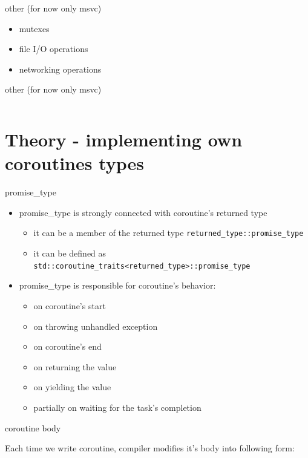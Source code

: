 \documentclass[10pt]{beamer}
\newcommand{\code}[1]{\texttt{#1}}
\begin{document}
\begin{frame}{other (for now only msvc)}
  \begin{itemize}
    \item mutexes
    \item file I/O operations
    \item networking operations
  \end{itemize}
\end{frame}

\begin{frame}{other (for now only msvc)}
  \inputminted[firstline=4]{c++}{code-examples/cppcoro/io.cpp}
\end{frame}

\section{Theory - implementing own coroutines types}

\begin{frame}{promise\_type}
  \begin{itemize}[<+- |alert@+>]
    \item promise\_type is strongly connected with coroutine's returned type
    \begin{itemize}[<+- |alert@+>]
      \item it can be a member of the returned type \code{returned\_type::promise\_type}
      \item it can be defined as \code{std::coroutine\_traits<returned\_type>::promise\_type}
    \end{itemize}
    \item promise\_type is responsible for coroutine's behavior:
    \begin{itemize}
      \item on coroutine's start
      \item on throwing unhandled exception
      \item on coroutine's end
      \item on returning the value
      \item on yielding the value
      \item partially on waiting for the task's completion
    \end{itemize}
  
  \end{itemize}
\end{frame}

\begin{frame}{coroutine body}
\centerline{Each time we write coroutine, compiler modifies it's body into following form:}
\inputminted[firstline=1]{c++}{code-examples/theory-custom-coroutine/coroutine-body.cpp}
\end{frame}
\end{document}
